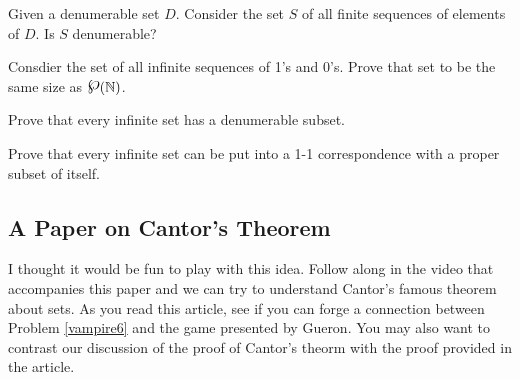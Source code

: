 \begin{problem}
Given a denumerable set $D$.  Consider the set $S$ of all finite sequences of elements of $D$.  Is $S$ denumerable?
\end{problem}

\begin{problem}
Consdier the set of all infinite sequences of 1's and 0's.  Prove that set to be the same size as $\powerset(\mathbb{N})$.
\end{problem}

\begin{problem}
Prove that every infinite set has a denumerable subset.
\end{problem}

\newpage
\begin{problem}
Prove that every infinite set can be put into a 1-1 correspondence with a proper subset of itself.
\end{problem}

\subsection{A Paper on Cantor's Theorem}
\vspace{-2em}
I thought it would be fun to play with this idea.  Follow along in the video that accompanies this paper and we can try to understand Cantor's famous theorem about sets.  As you read this article, see if you can forge a connection between   Problem \ref{vampire6} and the game presented by Gueron.  You may also want to contrast our discussion of the proof of Cantor's theorm with the proof provided in the article. \cite{gueron2001}
 \fancyfoot[CE CO]{}
\fancyfoot[RE,RO]{}
\fancyfoot[LE,LO]{}
